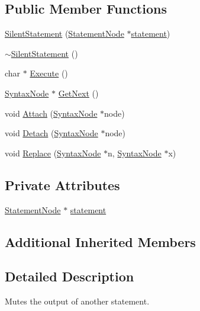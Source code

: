 \subsection*{Public Member Functions}
\begin{DoxyCompactItemize}
\item 
\hyperlink{classSilentStatement_aba2d6f5ec935ec1ecf28bed3e1d01959}{Silent\+Statement} (\hyperlink{classStatementNode}{Statement\+Node} $\ast$\hyperlink{classSilentStatement_a0b9a037a637e7b96459b0540185241d1}{statement})
\item 
\hyperlink{classSilentStatement_a1dfe8a53867fc979451d2e2b89b30c7f}{$\sim$\+Silent\+Statement} ()
\item 
char $\ast$ \hyperlink{classSilentStatement_a8fdf9e3c83dafa43d092282db0bd47b4}{Execute} ()
\item 
\hyperlink{classSyntaxNode}{Syntax\+Node} $\ast$ \hyperlink{classSilentStatement_a8ace65e0240c3063ef33e231704fc3ad}{Get\+Next} ()
\item 
void \hyperlink{classSilentStatement_aa8aa6ca07dca7f225b45610436b1d34b}{Attach} (\hyperlink{classSyntaxNode}{Syntax\+Node} $\ast$node)
\item 
void \hyperlink{classSilentStatement_abb1fe13d3e3f85ac304c39379242ae49}{Detach} (\hyperlink{classSyntaxNode}{Syntax\+Node} $\ast$node)
\item 
void \hyperlink{classSilentStatement_a5778745fefed52ad409b26e778805b03}{Replace} (\hyperlink{classSyntaxNode}{Syntax\+Node} $\ast$n, \hyperlink{classSyntaxNode}{Syntax\+Node} $\ast$x)
\end{DoxyCompactItemize}
\subsection*{Private Attributes}
\begin{DoxyCompactItemize}
\item 
\hyperlink{classStatementNode}{Statement\+Node} $\ast$ \hyperlink{classSilentStatement_a0b9a037a637e7b96459b0540185241d1}{statement}
\end{DoxyCompactItemize}
\subsection*{Additional Inherited Members}


\subsection{Detailed Description}
Mutes the output of another statement. 

